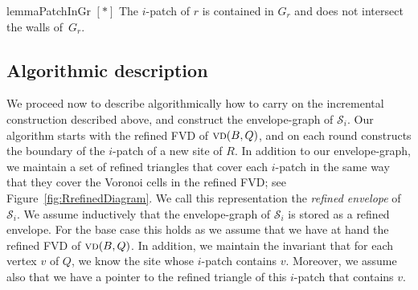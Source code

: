 \documentclass[a4paper,UKenglish]{socg-lipics-v2018}
\newcommand{\icell}[1][i]{${#1}$-patch\xspace}
\newcommand{\icells}[1][i]{${#1}$-patches\xspace}
\newcommand{\s}{\mathcal S}
\newcommand{\p}[3][P]{\ensuremath{\pi_{_{#1}}(#2, #3)}}
\newcommand{\vd}[2][P]{\textsc{vd}(#2, #1)}
\begin{document}
\begin{restatable}{lemma}{PatchInGr}\label{lemma: Patch in G_r}
\hyperref[ProofPatchInGr]{$[*]$}
The \icell of $r$ is contained in $G_r$ and does not intersect the walls of~$G_r$.
\end{restatable}
\newcommand{\ProofPatchInGr}{
\PatchInGr*
\begin{proof}\label{ProofPatchInGr}
\hyperref[lemma: Patch in G_r]{$\hookleftarrow$}
Because $f_r$ is only defined in $G_r$, we get trivially that the \icell of $r$ is contained in $G_r$. To prove the second part of the result,
recall that the walls of $G_r$ are defined by the paths $\p{r}{u_r}$ and $\p{r}{v_r}$, where $u_r$ and $v_r$ lie strictly inside of the Voronoi cells of some blue sites (see Section~\ref{sec: Preprocessing of red sites}).
By Lemma~\ref{lemma:Patch contains vcell}, we know then that $u_r$ and $v_r$ lie strictly inside the \icells of some blue sites in $B$.
Therefore, if there was a point of the \icell of $r$ on any of the walls of $G_r$, say on $\p{r}{u_r}$, then by Lemma~\ref{lemma:Shadow points} $u_r$ would belong to the \icell of $r$---a contradiction as $u_r$ lies strictly inside the \icell of a blue site. 
\end{proof}
}




\subsection{Algorithmic description} 

We proceed now to describe algorithmically how to carry on the incremental construction described above, and construct the envelope-graph of $\s_i$.
Our algorithm starts with the refined FVD of $\vd[Q]{B}$, and on each round constructs the boundary of the \icell of a new site of $R$. 
In addition to our envelope-graph, we maintain a set of refined triangles that cover each \icell in the same way that they cover the Voronoi cells in the refined FVD; see Figure~\ref{fig:RrefinedDiagram}.
We call this representation the \emph{refined envelope} of $\s_i$.
We assume inductively that the envelope-graph of $\s_i$ is stored as a refined envelope. 
For the base case this holds as we assume that we have at hand the refined FVD of $\vd[Q]{B}$.
In addition, we maintain the invariant that for each vertex $v$ of $Q$, we know the site whose \icell contains $v$. 
Moreover, we assume also that we have a pointer to the refined triangle of this \icell that contains $v$.
\end{document}
